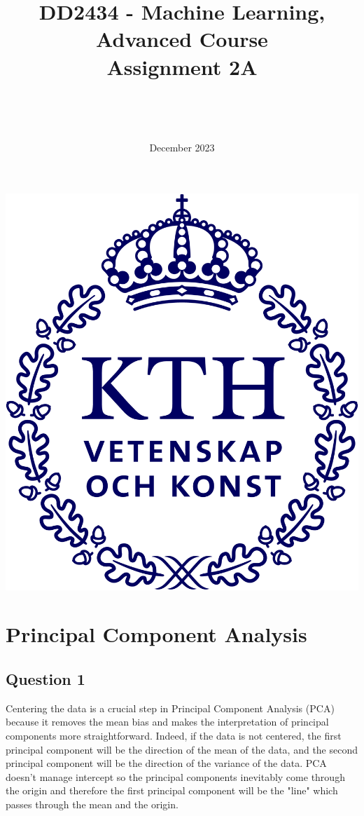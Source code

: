 \documentclass{article}
\title{DD2434 - Machine Learning, Advanced Course \\ Assignment 2A}
\author{\authorFst \\ \emailFst \and \authorSnd \\ \emailSnd}
\date{December 2023}
\begin{document}
\maketitle

\begin{center}
    \includegraphics[scale=0.5]{KTH_logo_RGB_bla.png}
\end{center}

\thispagestyle{empty}

\newpage
\tableofcontents
\newpage

\section{Principal Component Analysis}

\subsection{Question 1}

Centering the data is a crucial step in Principal Component Analysis (PCA) because it removes the mean bias and makes the interpretation of principal components more straightforward. Indeed, if the data is not centered, the first principal component will be the direction of the mean of the data, and the second principal component will be the direction of the variance of the data. PCA doesn't manage intercept so the principal components inevitably come through the origin and therefore the first principal component will be the "line" which passes through the mean and the origin.
\end{document}
